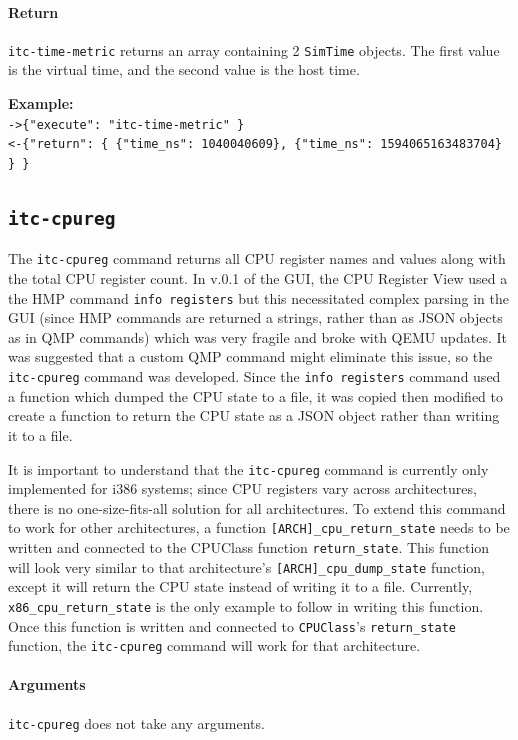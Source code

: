 \documentclass{article}
\newcommand{\code}[1]{\texttt{#1}}
\begin{document}
\paragraph{Return} \code{itc-time-metric} returns an array containing 2 \code{SimTime} objects. The first value is the virtual time, and the second value is the host time.

\textbf{Example:}\\
\code{->\{"execute": "itc-time-metric" \}}\\
\code{<-\{"return": \{ \{"time\_ns": 1040040609\}, \{"time\_ns": 1594065163483704\} \} \}}


\subsection{\code{itc-cpureg}}
The \code{itc-cpureg} command returns all CPU register names and values along with the total CPU register count. In v.0.1 of the GUI, the CPU Register View used a the HMP command \code{info registers} but this necessitated complex parsing in the GUI (since HMP commands are returned a strings, rather than as JSON objects  as in QMP commands) which was very fragile and broke with QEMU updates. It was suggested that a custom QMP command might eliminate this issue, so the \code{itc-cpureg} command was developed. Since the \code{info registers} command used a function which dumped the CPU state to a file, it was copied then modified to create a function to return the CPU state as a JSON object rather than writing it to a file. 

It is important to understand that the \code{itc-cpureg} command is currently only implemented for i386 systems; since CPU registers vary across architectures, there is no one-size-fits-all solution for all architectures. To extend this command to work for other architectures, a function  \code{[ARCH]\_cpu\_return\_state} needs to be written and connected to the CPUClass function \code{return\_state}. This function will look very similar to that architecture's \code{[ARCH]\_cpu\_dump\_state} function, except it will return the CPU state instead of writing it to a file. Currently, \code{x86\_cpu\_return\_state} is the only example to follow in writing this function. Once this function is written and connected to \code{CPUClass}'s \code{return\_state} function, the \code{itc-cpureg} command will work for that architecture.


\paragraph{Arguments} \code{itc-cpureg} does not take any arguments.
\end{document}
